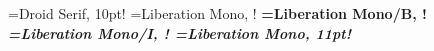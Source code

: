 
\def\monofont{\dofont Liberation Mono}
\def\seriffont{\dofont Droid Serif}

\fontsize=7.5pt
\font\headlinefont=\seriffont, 10pt!
\font\rm=\monofont, \fontsize!
\font\bf=\monofont/B, \fontsize!
\font\it=\monofont/I, \fontsize!
\font\headerfont=\monofont, 11pt!

\def\typ{\col{0 0 .5}\bf}   %
\def\com{\col{.3 .3 .3}\it} %
\def\str{\col{0 .7 0}\rm}   %
\def\dir{\col{.5 0 0}\it}   %
\def\key{\col{0 0 0}\bf}    %
\def\con{\col{.8 .1 .2}\rm} %
\def\tem{\col{.0 .2 .8}\bf} %

\def\docname{Tři nerdi – notebook}
